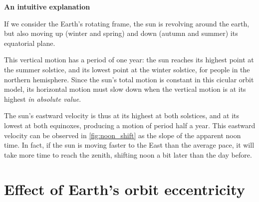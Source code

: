 \documentclass[12pt]{article}
\begin{document}
\textbf{An intuitive explanation}

If we consider the Earth's rotating frame,
the sun is revolving around the earth, but also moving up 
(winter and spring) and down (autumn and summer) its equatorial plane.

This vertical motion has a period of one year: the sun reaches its highest point
at the summer solstice, and its lowest point at the winter solstice, for people 
in the northern hemisphere. Since the sun's total motion is constant in this 
cicular orbit model, its horizontal motion must slow down when the vertical 
motion is at its highest \textit{in absolute value}. 

The sun's eastward velocity is thus at its highest
at both solstices, and at its lowest at both equinoxes, producing a
motion of period half a year. This eastward velocity can be observed in 
\ref{fig:noon_shift} as the slope of the apparent noon time. In fact, 
if the sun is moving faster to the East than the average pace, it will take 
more time to reach the zenith, shifting noon a bit later than the day before.


\clearpage
\section{Effect of Earth's orbit eccentricity}
\end{document}
